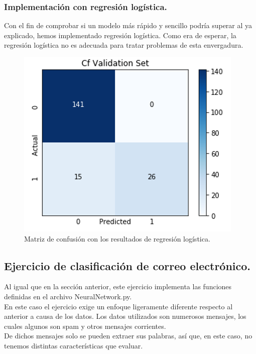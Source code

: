 \documentclass[a4paper,11pt]{article}
\begin{document}
\subsubsection{Implementación con regresión logística.}
Con el fin de comprobar si un modelo más rápido y sencillo podría superar al ya explicado, hemos implementado regresión logística. Como era de esperar, la regresión logística no es adecuada para tratar problemas de esta envergadura.
\begin{figure}[H]
\centering
\includegraphics[scale=0.6]{Annotation 2020-03-23 193133.png}
\caption{Matriz de confusión con los resultados de regresión logística.}
\end{figure}

\subsection{Ejercicio de clasificación de correo electrónico.}
Al igual que en la sección anterior, este ejercicio implementa las funciones definidas en el archivo NeuralNetwork.py.\\ 

\noindent
En este caso el ejercicio exige un enfoque ligeramente diferente respecto al anterior a causa de los datos. Los datos utilizados son numerosos mensajes, los cuales algunos son spam y otros mensajes corrientes. \\

\noindent
De dichos mensajes solo se pueden extraer sus palabras, así que, en este caso, no tenemos distintas características que evaluar.
\end{document}
